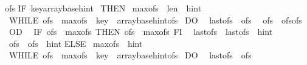 \begin{isabellebody}
{\isasymacute}ofs{\isacharcolon}{\isacharequal}{\isacharequal}{}{\isacharsemicolon}{\isacharsemicolon}\isanewline
IF\ {\isasymacute}key{\isachargreater}{\isasymacute}array{\isacharbang}{\isacharparenleft}{\isasymacute}base{\isacharplus}{\isasymacute}hint{\isacharparenright}\ \isanewline
THEN\isanewline
\ {\isasymacute}max{\isacharunderscore}ofs\ {\isacharcolon}{\isacharequal}{\isacharequal}\ {\isasymacute}len\ {\isacharminus}\ {\isasymacute}hint{\isacharsemicolon}{\isacharsemicolon}\isanewline
\ WHILE\ {\isacharparenleft}{\isasymacute}ofs\ {\isacharless}\ {\isasymacute}max{\isacharunderscore}ofs\ {\isacharampersand}\ {\isasymacute}key\ {\isachargreater}\ {\isasymacute}array{\isacharbang}{\isacharparenleft}{\isasymacute}base{\isacharplus}{\isasymacute}hint{\isacharplus}{\isasymacute}ofs{\isacharparenright}{\isacharparenright}\isanewline
\ DO\isanewline
\ \ {\isasymacute}last{\isacharunderscore}ofs\ {\isacharcolon}{\isacharequal}{\isacharequal}\ {\isasymacute}ofs{\isacharsemicolon}{\isacharsemicolon}\isanewline
\ \ {\isasymacute}ofs\ {\isacharcolon}{\isacharequal}{\isacharequal}\ {\isasymacute}ofs{\isacharplus}{\isasymacute}ofs{\isacharplus}{}\isanewline
\ OD\ {\isacharsemicolon}{\isacharsemicolon}\isanewline
\ IF\ {\isasymacute}ofs\ {\isachargreater}\ {\isasymacute}max{\isacharunderscore}ofs\ THEN\ {\isasymacute}ofs\ {\isacharcolon}{\isacharequal}{\isacharequal}\ {\isasymacute}max{\isacharunderscore}ofs\ FI\ {\isacharsemicolon}{\isacharsemicolon}\isanewline
\ {\isasymacute}last{\isacharunderscore}ofs\ {\isacharcolon}{\isacharequal}{\isacharequal}\ {\isasymacute}last{\isacharunderscore}ofs\ {\isacharplus}\ {\isasymacute}hint{\isacharplus}{}{\isacharsemicolon}{\isacharsemicolon}\isanewline
\ {\isasymacute}ofs\ {\isacharcolon}{\isacharequal}{\isacharequal}\ {\isasymacute}ofs\ {\isacharplus}\ {\isasymacute}hint\isanewline
ELSE\isanewline
\ {\isasymacute}max{\isacharunderscore}ofs\ {\isacharcolon}{\isacharequal}{\isacharequal}\ {\isasymacute}hint\ {\isacharplus}\ {}{\isacharsemicolon}{\isacharsemicolon}\isanewline
\ WHILE\ {\isacharparenleft}{\isasymacute}ofs\ {\isacharless}\ {\isasymacute}max{\isacharunderscore}ofs\ {\isacharampersand}\ {\isasymacute}key\ {\isasymle}\ {\isasymacute}array{\isacharbang}{\isacharparenleft}{\isasymacute}base{\isacharplus}{\isasymacute}hint{\isacharminus}{\isasymacute}ofs{\isacharparenright}{\isacharparenright}\isanewline
\ DO\isanewline
\ \ {\isasymacute}last{\isacharunderscore}ofs\ {\isacharcolon}{\isacharequal}{\isacharequal}\ {\isasymacute}ofs{\isacharsemicolon}{\isacharsemicolon}\isanewline

\end{isabellebody}

